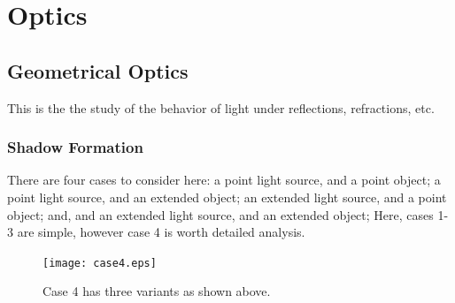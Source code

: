 \documentclass{scrartcl}
\begin{document}
    \section{Optics}
    \subsection{Geometrical Optics}\newline
    This is the the study of the behavior of light under reflections, refractions, etc.
    \subsubsection{Shadow Formation}\newline
    \quad There are four cases to consider here: a point light source, and a point object; a point light source, and an extended object; an extended light source, and a point object; and, and an extended light source, and an extended object; Here, cases 1-3 are simple, however case 4 is worth detailed analysis.
    \begin{figure}[H]
        \centering
        \texttt{[image: case4.eps]}
        \caption{Case 4 has three variants as shown above.}
    \end{figure}
\end{document}
